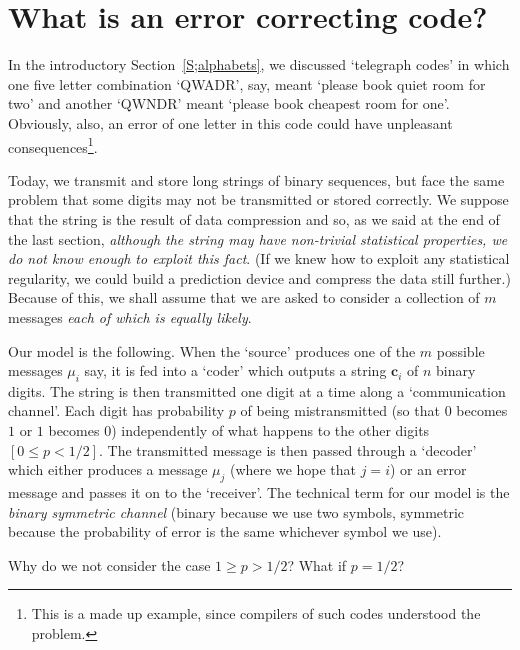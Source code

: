 \section{What is an error correcting code?}
In the introductory Section~\ref{S;alphabets}, 
we discussed `telegraph codes' in which
one five letter
combination `QWADR', say, meant `please book
quiet room for two' and another `QWNDR' meant
`please book cheapest room for one'.
Obviously, also, an error of one letter
in this code could have unpleasant
consequences\footnote{This is a made up example,
since compilers of such codes understood the problem.}.

Today, we transmit and store long strings of 
binary sequences, but face the same problem
that some digits may not be transmitted or stored correctly.
We suppose that the string is the result of data compression
and so, as we said at the end of the last
section, \emph{although the string 
may have non-trivial
statistical properties, 
we do not know
enough to exploit this fact}. (If we knew how to
exploit any statistical regularity, we could build a
prediction device and compress the data still further.)
Because of this, we shall assume that
we are asked to consider a collection
of $m$ messages \emph{each of which is equally
likely}.

Our model is the following. When the `source'
produces one of the $m$ possible messages $\mu_{i}$ say,
it is fed into a `coder' which outputs
a string $\mathbf{c}_{i}$ of $n$ binary digits.
The string is then transmitted one digit
at a time along a `communication channel'.
Each digit has probability $p$ of being mistransmitted
(so that $0$ becomes $1$ or $1$ becomes $0$)
independently of what happens to the other digits $[0\leq p<1/2]$.
The transmitted message is then passed through
a `decoder' which either produces a message $\mu_{j}$
(where we hope that $j=i$) or an error message
and passes it on to the `receiver'.
The technical term for our model is the
\emph{binary symmetric channel} (binary because
we use two symbols, symmetric because
the probability of error is the same whichever 
symbol we use).
\begin{exercise}\label{Reverse} Why do we not consider
the case $1\geq p>1/2$? What
if $p=1/2$?
\end{exercise}

